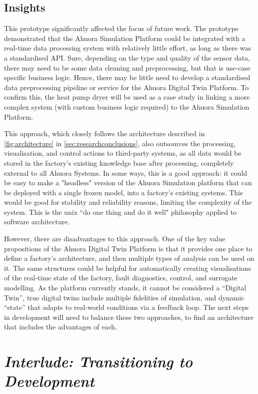 \documentclass[12pt]{report}
\begin{document}
\section{Insights}

This prototype significantly affected the focus of future work. The prototype demonstrated that the Ahuora Simulation Platform could be integrated with a real-time data processing system with relatively little effort, as long as there was a standardised API. Sure, depending on the type and quality of the sensor data, there may need to be some data cleaning and preprocessing, but that is use-case specific business logic. Hence, there may be little need to develop a standardised data preprocessing pipeline or service for the Ahuora Digital Twin Platform.
To confirm this, the heat pump dryer will be used as a case study in linking a more complex system (with custom business logic required) to the Ahuora Simulation Platform.

This approach, which closely follows the architecture described in \cref{fig:architecture} in \cref{sec:researchconclusions}, also outsources the processing, visualisation, and control actions to third-party systems, as all data would be stored in the factory's existing knowledge base after processing, completely external to all Ahuora Systems. In some ways, this is a good approach: it could be easy to make a "headless" version of the Ahuora Simulation platform that can be deployed with a single frozen model, into a factory's existing systems. This would be good for stability and reliability reasons, limiting the complexity of the system. This is the unix ``do one thing and do it well" philosophy applied to software architecture.

However, there are disadvantages to this approach. One of the key value propositions of the Ahuora Digital Twin Platform is that it provides one place to define a factory's architecture, and then multiple types of analysis can be used on it. The same structures could be helpful for automatically creating visualisations of the real-time state of the factory, fault diagnostics, control, and surrogate modelling. As the platform currently stands, it cannot be considered a ``Digital Twin'', true digital twins include multiple fidelities of simulation, and dynamic ``state'' that adapts to real-world conditions via a feedback loop. The next steps in development will need to balance these two approaches, to find an architecture that includes the advantages of each.

\chapter*{\textit{Interlude: Transitioning to Development}} \label{sec:interlude}
\end{document}
